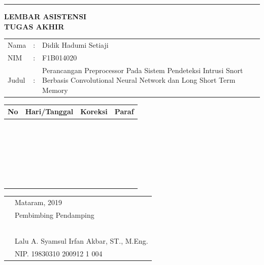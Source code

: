 \documentclass{report}
\begin{document}
\noindent\rule{\textwidth}{2pt}
\begin{center}
    \textbf{LEMBAR ASISTENSI\\
    TUGAS AKHIR}\\
\end{center}
\begin{tabularx}{\textwidth}{llX}
Nama & : & Didik Hadumi Setiaji \\
NIM & : & F1B014020 \\
Judul & : & Perancangan Preprocessor Pada Sistem Pendeteksi Intrusi Snort Berbasis Convolutional Neural Network dan Long Short Term Memory \\
\end{tabularx}
\begin{table}[H]
    \centering
    \begin{tabularx}{\textwidth}{
    | c %
    | >{\hsize=0.66\hsize }X %
    | >{\hsize=1.34\hsize }X %
    | p{2cm} %
    |}
    \hline
    \textbf{No} & \textbf{Hari/Tanggal} & \textbf{Koreksi} & \textbf{Paraf}\\
    \hline
     & & & \\
     & & & \\
     & & & \\
     & & & \\
     & & & \\
     & & & \\
     & & & \\
     & & & \\
     & & & \\
     & & & \\
     & & & \\
     & & & \\
     & & & \\
     & & & \\
     & & & \\
     & & & \\
     & & & \\
     & & & \\
     & & & \\
     & & & \\
     & & & \\
     & & & \\
     & & & \\
     & & & \\
     & & & \\
     & & & \\
     \hline
    \end{tabularx}
    \label{tab:my_label}
\end{table}
\begin{tabularx}{\textwidth}{XX}
& Mataram, \hspace{3cm} 2019 \\
& Pembimbing Pendamping \\ \\ \\ \\ \\ \\
& Lalu A. Syamsul Irfan Akbar, ST., M.Eng. \\
& NIP. 19830310 200912 1 004
\end{tabularx}
\end{document}
